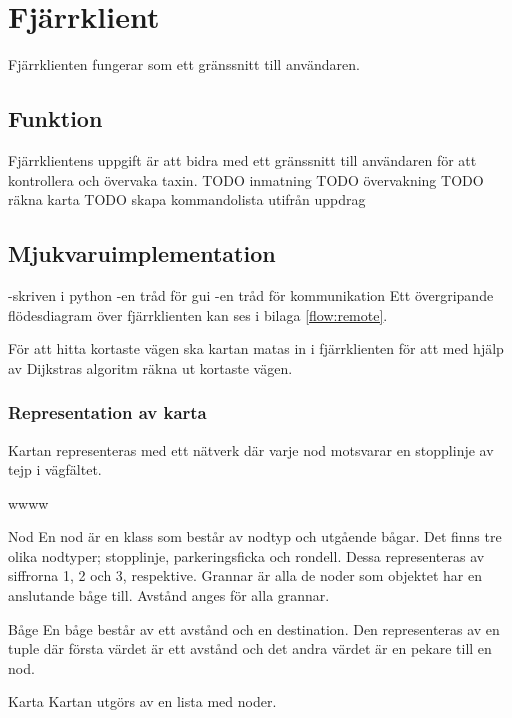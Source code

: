 \documentclass[designspec/spec.tex]{subfiles}
\begin{document}
\section{Fjärrklient}
Fjärrklienten fungerar som ett gränssnitt till användaren.

\subsection{Funktion}
Fjärrklientens uppgift är att bidra med ett gränssnitt till användaren för att
kontrollera och övervaka taxin.
TODO inmatning
TODO övervakning
TODO räkna karta
TODO skapa kommandolista utifrån uppdrag

\subsection{Mjukvaruimplementation}
    -skriven i python
    -en tråd för gui
    -en tråd för kommunikation
Ett övergripande flödesdiagram över fjärrklienten kan ses i bilaga
\ref{flow:remote}.

För att hitta kortaste vägen ska kartan matas in i fjärrklienten för att med
hjälp av Dijkstras algoritm räkna ut kortaste vägen. 

\subsubsection{Representation av karta}
Kartan representeras med ett nätverk där varje nod motsvarar en stopplinje av
tejp i vägfältet.

\begin{labeling}{wwww}
    \item[Nod] En nod är en klass som består av nodtyp och utgående bågar. Det
    finns tre olika nodtyper; stopplinje, parkeringsficka och rondell. Dessa
    representeras av siffrorna 1, 2 och 3, respektive.
    Grannar är alla de noder som objektet har en anslutande båge till. Avstånd
    anges för alla grannar.

    \item[Båge] En båge består av ett avstånd och en destination. Den
    representeras av en tuple där första värdet är ett avstånd och det andra
    värdet är en pekare till en nod.

    \item[Karta] Kartan utgörs av en lista med noder.
\end{labeling}
\end{document}
